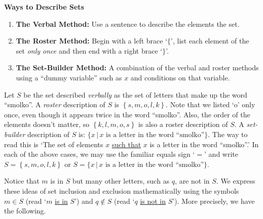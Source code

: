 \documentclass{ximera}
\begin{document}
\colorbox{ResultColor}{\bbm

\centerline{\textbf{Ways to Describe Sets}}

\begin{enumerate}

\item \textbf{The Verbal Method:} Use a sentence to describe the elements the set.

\item \textbf{The Roster Method:}  Begin with a left brace `$\{$', list each element of the set \textit{only once} and then end with a right brace `$\}$'.

\item \textbf{The Set-Builder Method:} A combination of the verbal and roster methods using a ``dummy variable'' such as $x$ and conditions on that variable.

\end{enumerate}

\ebm}

\medskip

Let $S$ be the set described \textit{verbally} as the set of letters that make up the word ``smolko''.  A  \emph{roster} description of $S$ is $\left\{ s, m, o, l, k \right\}$. Note that we listed `o' only once, even though it appears twice in the word ``smolko''.  Also, the order of the elements doesn't matter, so $\left\{ k,  l,  m, o, s \right\}$ is also a roster description of $S$.  A \emph{set-builder} description of $S$ is: $\{ x \, | \, \mbox{$x$ is a letter in the word ``smolko''}\}$.  The way to read this is `The set of elements $x$ \underline{such that} $x$ is a letter in the word ``smolko''.'   In each of the above cases, we may use the familiar equals sign `$=$' and write  $S = \left\{ s, m, o, l, k \right\}$ or $S = \{ x \, | \, \mbox{$x$ is a letter in the word ``smolko''}\}$.  

\smallskip

Notice that  $m$ is in $S$ but many other letters, such as $q$, are not in $S$.  We express these ideas of set inclusion and exclusion mathematically using the symbols $m \in S$ (read `$m$ \underline{is in} $S$') and $q \notin S$ (read `$q$ \underline{is not in} $S$').  More precisely, we have the following.

\medskip
\end{document}
